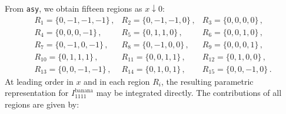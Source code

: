 \documentclass{article}
\begin{document}
From \texttt{asy}, we obtain fifteen regions as $x\downarrow 0$:
\begin{equation}
\begin{array}{lll}
R_{1}=\{0,-1,-1,-1\}\,, & R_{2}=\{0,-1,-1,0\}\,, & R_{3}=\{0,0,0,0\}\,, \\
R_{4}=\{0,0,0,-1\}\,, & R_{5}=\{0,1,1,0\}\,, & R_{6}=\{0,0,1,0\}\,, \\
R_{7}=\{0,-1,0,-1\}\,, & R_{8}=\{0,-1,0,0\}\,, & R_{9}=\{0,0,0,1\}\,, \\
R_{10}=\{0,1,1,1\}\,, & R_{11}=\{0,0,1,1\}\,, & R_{12}=\{0,1,0,0\}\,, \\
R_{13}=\{0,0,-1,-1\}\,, & R_{14}=\{0,1,0,1\}\,, & R_{15}=\{0,0,-1,0\}\,.
\end{array}
\end{equation}
At leading order in $x$ and in each region $R_i$, the resulting parametric representation for $I_{1111}^{\text{banana}}$ may be integrated directly. The contributions of all regions are given by:
\end{document}
